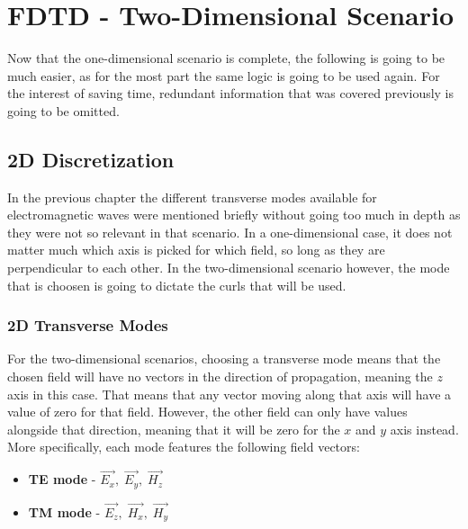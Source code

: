 
\chapter{FDTD - Two-Dimensional Scenario} %

\label{Chapter3} %


Now that the one-dimensional scenario is complete, the following is going to be much easier, as for the most part the same logic is going to be used again. For the interest of saving time, redundant information that was covered previously is going to be omitted.

\section{2D Discretization}

In the previous chapter the different transverse modes available for electromagnetic waves were mentioned briefly without going too much in depth as they were not so relevant in that scenario. In a one-dimensional case, it does not matter much which axis is picked for which field, so long as they are perpendicular to each other. In the two-dimensional scenario however, the mode that is choosen is going to dictate the curls that will be used. 

\subsection{2D Transverse Modes}

For the two-dimensional scenarios, choosing a transverse mode means that the chosen field will have no vectors in the direction of propagation, meaning the $z$ axis in this case. That means that any vector moving along that axis will have a value of zero for that field. However, the other field can only have values alongside that direction, meaning that it will be zero for the $x$ and $y$ axis instead. More specifically, each mode features the following field vectors:

\begin{itemize}
	\item \textbf{TE mode} - \space $\vec{E_x},\; \vec{E_y},\; \vec{H_z}$
	\item \textbf{TM mode} - \space $\vec{E_z},\; \vec{H_x},\; \vec{H_y}$
\end{itemize}

